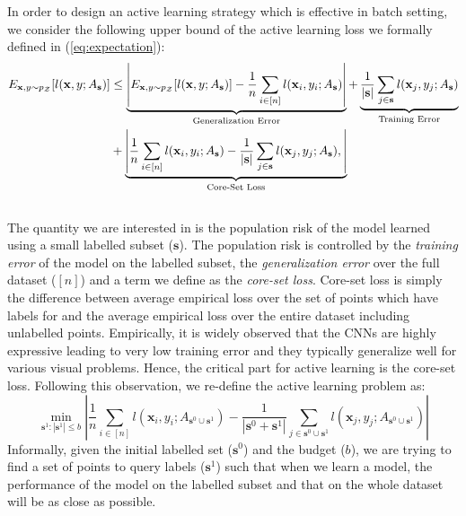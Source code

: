 \documentclass{article} %
\begin{document}
In order to design an active learning strategy which is effective in batch setting, we consider the following upper
bound of the active learning loss we formally defined in (\ref{eq:expectation}):
{ \small 
\begin{equation} \begin{aligned} 
E_{\mathbf{x},y \sim p_\mathcal{Z}} [l(\mathbf{x},y; A_{\mathbf{s}})]  &\leq \underbrace{\left| E_{\mathbf{x},y \sim p_\mathcal{Z}} [l(\mathbf{x},y; A_{\mathbf{s}})] - \frac{1}{n}\sum_{i \in [n]} l(\mathbf{x}_i,y_i; A_{\mathbf{s}}) \right|}_{\text{Generalization Error}}  + \underbrace{\frac{1}{|\mathbf{s}|}\sum_{j \in \mathbf{s}} l(\mathbf{x}_j,y_j; A_{\mathbf{s}})}_{\text{Training Error}} \\ &+
   \underbrace{\left| \frac{1}{n}\sum_{i \in [n]} l(\mathbf{x}_i,y_i; A_{\mathbf{s}}) - \frac{1}{|\mathbf{s}|}\sum_{j \in \mathbf{s}} l(\mathbf{x}_j,y_j; A_{\mathbf{s}}), \right|}_{\text{Core-Set Loss}} 
   \\ &
\end{aligned} \vspace{-3mm} \end{equation} }
The quantity we are interested in is the population risk of the model learned using a small labelled subset ($\mathbf{s}$).
The population risk is controlled by the \emph{training error} of the model on the labelled subset, the \emph{generalization error} over the
full dataset ($[n]$) and a term we define as the \emph{core-set loss}. Core-set loss is simply the
difference between average empirical loss over the set of points which have labels for and the average empirical loss over the entire
dataset including unlabelled points. Empirically, it is widely observed that the CNNs are highly expressive leading to very low training error and they typically generalize well for various visual problems. Hence, the critical part for active learning is the core-set loss. Following this observation, we re-define the active learning problem as:
\begin{equation} \min_{\mathbf{s}^1 : |\mathbf{s}^1| \leq b} 
\left| \frac{1}{n}\sum_{i \in [n]} l(\mathbf{x}_i,y_i; A_{\mathbf{s}^0 \cup \mathbf{s}^1}) -
    \frac{1}{|\mathbf{s}^0+\mathbf{s}^1|}\sum_{j \in \mathbf{s}^0 \cup \mathbf{s}^1} l(\mathbf{x}_j,y_j;A_{\mathbf{s}^0 \cup \mathbf{s}^1})
    \right|
    \label{eq:new_active_learning}
\end{equation} 
Informally, given the initial labelled set ($\mathbf{s}^0$) and the budget ($b$), we are trying to find a set of points
to query labels ($\mathbf{s}^1$) such that when we learn a model, the performance of the model on the labelled subset
and that on the whole dataset will be as close as possible.
\end{document}
